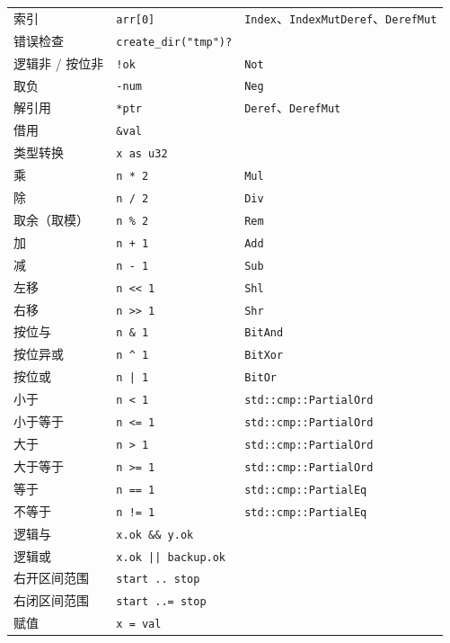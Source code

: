 \begin{xltabular}{\textwidth}{@{}>{\hsize\raggedright\arraybackslash}X>{\hsize\raggedright\arraybackslash}X>{\hsize\raggedright\arraybackslash}X@{}}
索引 & \texttt{arr[0]} & \texttt{Index}、\texttt{IndexMutDeref}、\texttt{DerefMut} \\
错误检查 & \texttt{create\_dir("tmp")?} &  \\
逻辑非 / 按位非 & \texttt{!ok} & \texttt{Not} \\
取负 & \texttt{-num} & \texttt{Neg} \\
解引用 & \texttt{*ptr} & \texttt{Deref}、\texttt{DerefMut} \\
借用 & \texttt{\&val} &  \\
类型转换 & \texttt{x as u32} &  \\
乘 & \texttt{n * 2} & \texttt{Mul} \\
除 & \texttt{n / 2} & \texttt{Div} \\
取余（取模） & \texttt{n \% 2} & \texttt{Rem} \\
加 & \texttt{n + 1} & \texttt{Add} \\
减 & \texttt{n - 1} & \texttt{Sub} \\
左移 & \texttt{n << 1} & \texttt{Shl} \\
右移 & \texttt{n >> 1} & \texttt{Shr} \\
按位与 & \texttt{n \& 1} & \texttt{BitAnd} \\
按位异或 & \texttt{n \textasciicircum{} 1} & \texttt{BitXor} \\
按位或 & \texttt{n | 1} & \texttt{BitOr} \\
小于 & \texttt{n < 1} & \texttt{std::cmp::PartialOrd} \\
小于等于 & \texttt{n <= 1} & \texttt{std::cmp::PartialOrd} \\
大于 & \texttt{n > 1} & \texttt{std::cmp::PartialOrd} \\
大于等于 & \texttt{n >= 1} & \texttt{std::cmp::PartialOrd} \\
等于 & \texttt{n == 1} & \texttt{std::cmp::PartialEq} \\
不等于 & \texttt{n != 1} & \texttt{std::cmp::PartialEq} \\
逻辑与 & \texttt{x.ok \&\& y.ok} &  \\
逻辑或 & \texttt{x.ok || backup.ok} &  \\
右开区间范围 & \texttt{start .. stop} &  \\
右闭区间范围 & \texttt{start ..= stop} &  \\
赋值 & \texttt{x = val} &  \\

\end{xltabular}

